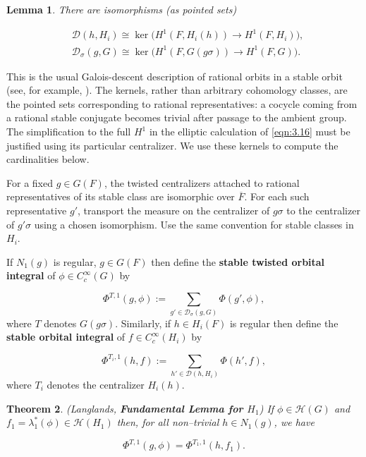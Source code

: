 \documentclass[12pt,letterpaper]{amsart}
\numberwithin{equation}{section}
\newtheorem{theorem}{Theorem}[section]
\newtheorem{lemma}[theorem]{Lemma}
\theoremstyle{definition}
\theoremstyle{plain}
\providecommand{\cal}{\mathcal}
\def\hhh{{\cal H}}
\def\ddd{{\cal D}}
\def\ovF{\overline{F}}
\begin{document}
\begin{lemma}
\label{lemma:1.21} 
There are isomorphisms (as pointed sets)

\[
\begin{split}
&\ddd (h, H_i) \cong
\ker\bigl(H^1(F,H_i(h))\longrightarrow H^1(F,H_i)\bigr),\\
&\ddd_{\sigma}(g,G) \cong
\ker\bigl(H^1(F,G(g\sigma))\longrightarrow H^1(F,G)\bigr).
\end{split}
\]
\end{lemma}
 
This is the usual Galois-descent description of rational orbits in a
stable orbit (see, for example, \cite{La80a}). The kernels, rather than
arbitrary cohomology classes, are the pointed sets corresponding to
rational representatives: a cocycle coming from a rational stable
conjugate becomes trivial after passage to the ambient group.
The simplification to the full $H^1$ in the elliptic calculation of
\eqref{eqn:3.16} must be justified using its particular centralizer. 
We use these kernels to compute the cardinalities below.
 
For a fixed $g\in G(F)$, the twisted centralizers attached to
rational representatives of its stable class are isomorphic over
$\ovF$. For each such representative $g'$, transport the measure on
the centralizer of $g\sigma$ to the centralizer of $g'\sigma$
using a chosen isomorphism. Use the same convention for stable
classes in $H_i$.

If $N_1(g)$ is regular, $g \in G(F)$ then define the {\bf stable twisted 
orbital integral} of $\phi \in C^\infty_c(G)$ by

\begin{equation}
\label{eqn:1.22}
\Phi^{T,1}(g,\phi ):= \sum_{g' \in \ddd_{\sigma}(g,G)} \Phi (g',\phi ),
\end{equation}
where $T$ denotes $G(g\sigma )$.
Similarly, if $h \in H_i(F)$ is regular then define the
{\bf stable orbital integral} of $f \in C^\infty_c(H_i)$ by

\begin{equation}
\label{eqn:1.23}
\Phi^{T_i,1}(h,f):= \sum_{h' \in \ddd(h,H_i)} \Phi (h',f),
\end{equation}
where $T_i$ denotes the centralizer $H_i(h)$.

\begin{theorem} (Langlands,
{\bf Fundamental Lemma for $H_1$})
\label{thrm:fundlemmaH1}
If
$\phi \in \hhh (G)$ and $f_1 = \lambda_1^*(\phi ) \in
\hhh (H_1)$ then, for all non--trivial $h \in N_1(g)$, we have

\begin{equation}
\label{eqn:1.24}
\Phi^{T,1}(g,\phi ) = \Phi^{T_1,1}(h,f_1).
\end{equation}
\end{theorem}
 
\end{document}
